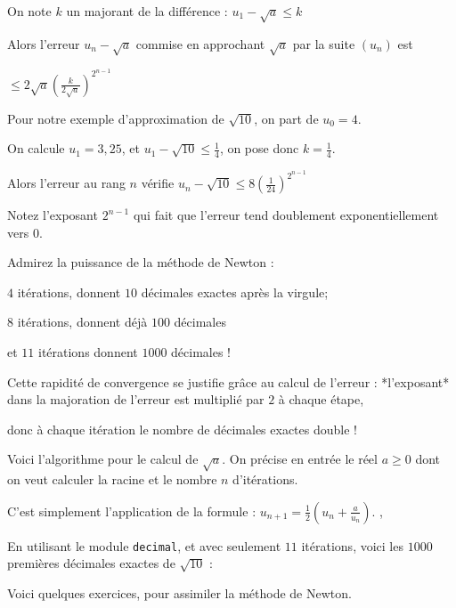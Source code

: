 On note $k$ un majorant de la différence : $u_1-\sqrt a\le k$

Alors l'erreur $u_n - \sqrt{a}$ commise en approchant
$\sqrt{a}$ par la suite $(u_n)$ est 

  $\le 2\sqrt{a} \left( \frac{k}{2\sqrt{a}} \right)^{2^{n-1}}$
  
  \change
  
  Pour notre exemple d'approximation de $\sqrt{10}$,
  on part de $u_0=4$.
  
  On calcule $u_1=3,25$, et $u_1-\sqrt{10} \le \frac14$, on pose donc $k=\frac14$.
  
  Alors l'erreur au rang $n$ vérifie 
  $u_n - \sqrt{10} \le 8 \left(\frac{1}{24} \right)^{2^{n-1}}$
  
  Notez l'exposant $2^{n-1}$ qui fait que l'erreur tend doublement exponentiellement vers $0$.
  
\change

Admirez la puissance de la méthode de Newton :

$4$ itérations, donnent $10$ décimales exactes après la virgule;

$8$ itérations, donnent déjà $100$ décimales

et $11$ itérations donnent $1000$ décimales !

Cette rapidité de convergence se justifie grâce
au calcul de l'erreur : *l'exposant* dans la majoration de l'erreur est 
multiplié par $2$ à chaque étape, 

donc à chaque itération le nombre de décimales exactes double !




\diapo

Voici l'algorithme pour le calcul de $\sqrt{a}$. 
On précise en entrée le réel $a\ge0$ dont on veut calculer 
la racine et le nombre $n$ d'itérations.

C'est simplement l'application de la formule :
$u_{n+1} = \frac12 \left(u_n+\frac{a}{u_n}\right).$
,

\diapo

En utilisant le module \texttt{decimal}, et avec seulement $11$
itérations, voici les $1000$ premières décimales exactes de $\sqrt{10}$ :


\diapo

Voici quelques exercices, pour assimiler la méthode de Newton.



